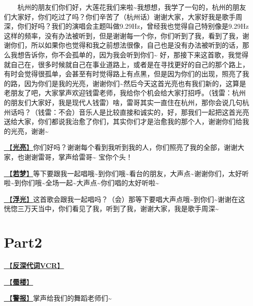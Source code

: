 \documentclass[]{ctexbook}
\begin{document}
  杭州的朋友们你们好，大莲花我们来啦\textasciitilde 我想想，我学了一句的，杭州的朋友们大家好，你们吃过了吗？你们辛苦了（杭州话）谢谢大家，大家好我是歌手周深，你们好吗？我们的演唱会主题叫做9.29Hz，曾经我也觉得自己特别像是9.29Hz这样的频率，没有办法被听到，但是谢谢每一个你，你们听到了我，看到了我，谢谢你们，所以如果你也觉得和我之前想法很像，自己也是没有办法被听到的话，那么我想告诉你，你不会孤单的，因为我会听到你们\textasciitilde{}
好，那接下来这首歌，我觉得就自己在，很多时候就自己在事业道路上，或者是在寻找更好的自己的那个路上，有时会觉得很孤单，会甚至有时觉得路上有点黑，但是因为你们的出现，照亮了我的路，因为你们是我的光亮，谢谢你们\textasciitilde 然后今天这首光亮也有我们新的，这算是老朋友了吧，大家掌声欢迎钱雷老师，我给你个机会给大家打招呼。（钱雷：杭州的朋友们大家好，我是现代人钱雷）啥，雷哥其实一直住在杭州，那你会说几句杭州话吗？（钱雷：不会）音乐人是比较直接和诚实的，好，那我们一起把这首光亮送给大家，你们都说我治愈了你们，其实你们才是治愈我的那个人，谢谢你们给我的光亮，谢谢\textasciitilde{}

\hyperref[silver-linings]{🎵【\textbf{光亮}】}你们好吗？谢谢每个看到我听到我的人，你们照亮了我的全部，谢谢大家，也谢谢雷哥，掌声给雷哥\textasciitilde{}
宝你个头！

\hyperref[ruomeng]{🎵【\textbf{若梦}】}等下要跟我一起唱哦\textasciitilde 到你们哦\textasciitilde 看台的朋友，大声点\textasciitilde 谢谢你们，太好听啦\textasciitilde 到你们哦\textasciitilde 全场一起\textasciitilde 大声点\textasciitilde 你们唱的太好听啦\textasciitilde{}

\hyperref[floating-light]{🎵【\textbf{浮光}】}这首歌会跟我一起唱吗？（会）那等下要唱大声点哦\textasciitilde 到你们\textasciitilde 谢谢在这恍惚三万天当中，你们看见了我，听到了我，谢谢大家，我是歌手周深\textasciitilde{}

\section{Part2}\label{hangzhou-20240823-part2}

\hyperref[senself-vcr]{🎥【\textbf{反深代词VCR}】}

\hyperref[mirage]{🎵【\textbf{蜃楼}】}

\hyperref[the-giver]{🎵【\textbf{警报}】}掌声给我们的舞蹈老师们\textasciitilde{}
\end{document}
